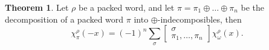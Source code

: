 \documentclass[submission]{FPSAC2023}
\theoremstyle{definition}
\newtheorem{thm}{Theorem}[section]
\newtheorem{lm}[thm]{Lemma}
\DeclareMathOperator{\pat}{\mathbf{pat}}
\newcommand{\xx}{\mathrm{x}}
\newcommand{\yy}{\mathrm{y}}
\newcommand{\zz}{\mathrm{z}}
\begin{document}

\begin{thm}
Let $\rho$ be a packed word, and let $\pi = \pi_1 \oplus\dots \oplus \pi_n$ be the decomposition of a packed word $\pi$ into $\oplus$-indecomposibles, then
    $$\chi^{\rho}_{\pi}(-x) = (-1)^n \sum_{\sigma}
    \begin{bmatrix}
    \sigma \\ \pi_1, \dots, \pi_n
    \end{bmatrix}
     \chi^{\rho}_{\omega}(x).$$
\end{thm}

\printbibliography
\end{document}
